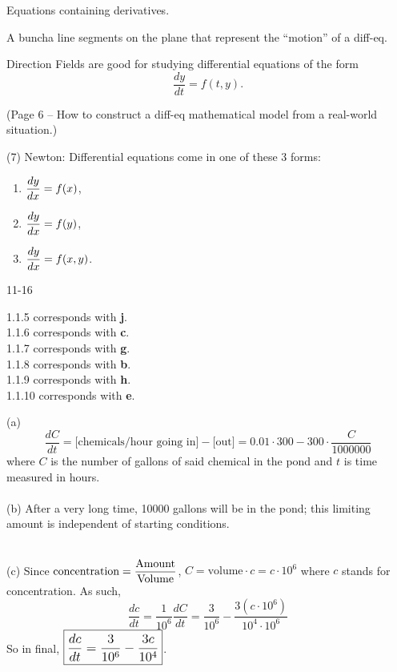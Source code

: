 \documentclass[../../diff_eqs.tex]{subfiles}
\begin{document}
\begin{definition}
    Equations containing derivatives.
\end{definition}

\begin{definition}
    A buncha line segments on the plane that represent the ``motion'' of a diff-eq.
\end{definition}

Direction Fields are good for studying differential equations of the form $$\frac{dy}{dt} = f(t, y)\text{.}$$

(Page 6 -- How to construct a diff-eq mathematical model from a real-world situation.)

(7) Newton: Differential equations come in one of these 3 forms:
\begin{enumerate}
    \item $\mathlarger{ \frac{dy}{dx} = f(x) }$,
    \item $\mathlarger{ \frac{dy}{dx} = f(y) }$,
    \item $\mathlarger{ \frac{dy}{dx} = f(x, y) }$.
\end{enumerate}


\hr

\begin{exercise}{11-16}

    1.1.5 corresponds with \textbf{j}. \\
    1.1.6 corresponds with \textbf{c}.   \\
    1.1.7 corresponds with \textbf{g}.   \\
    1.1.8 corresponds with \textbf{b}.   \\
    1.1.9 corresponds with \textbf{h}.   \\
    1.1.10 corresponds with \textbf{e}.   \\
\end{exercise}

\begin{exercise}{17}

    (a) $$\frac{dC}{dt} = \text{[chemicals/hour going in]} - \text{[out]} = 0.01 \cdot 300 - 300 \cdot \frac{C}{1000000}$$ where $C$ is the number of gallons of said chemical in the pond and $t$ is time measured in hours. \\ 

    \phantom \\ 

    (b) After a very long time, 10000 gallons will be in the pond; this limiting amount is independent of starting conditions. 

    \phantom \\ 

    (c) Since $\mathlarger{ \text{concentration} = \frac{\text{Amount}}{\text{Volume}} }$, $C = \text{volume} \cdot c = c\cdot 10^6$ where $c$ stands for concentration. As such, $$\frac{dc}{dt} = \frac{1}{10^6} \frac{dC}{dt} = \frac{3}{10^6} - \frac{3(c \cdot 10^6)}{10^4 \cdot 10^6}$$
    So in final, $\boxed{\mathlarger{\frac{dc}{dt} = \frac{3}{10^6} - \frac{3c}{10^4}}}$.
\end{exercise}
\end{document}
